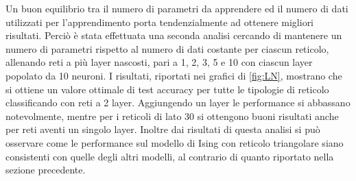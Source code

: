 \documentclass{article}
\begin{document}
Un buon equilibrio tra il numero di parametri da apprendere ed il numero di dati utilizzati per l'apprendimento porta tendenzialmente ad ottenere migliori risultati.
Perciò è stata effettuata una seconda analisi cercando di mantenere un numero di parametri rispetto al numero di dati costante per ciascun reticolo, allenando reti a più layer nascosti, pari a  1, 2, 3, 5 e 10 con ciascun layer popolato da 10 neuroni.
I risultati, riportati nei grafici di \ref{fig:LN}, mostrano che si ottiene un valore ottimale di test accuracy per tutte le tipologie di reticolo classificando con reti a 2 layer. Aggiungendo un layer le performance si abbassano notevolmente, mentre per i reticoli di lato 30 si ottengono buoni risultati anche per reti aventi  un singolo layer.
Inoltre dai risultati di questa analisi si può osservare come le performance sul modello di Ising con reticolo triangolare siano consistenti con quelle degli altri modelli, al contrario di quanto riportato nella sezione precedente.
\end{document}
